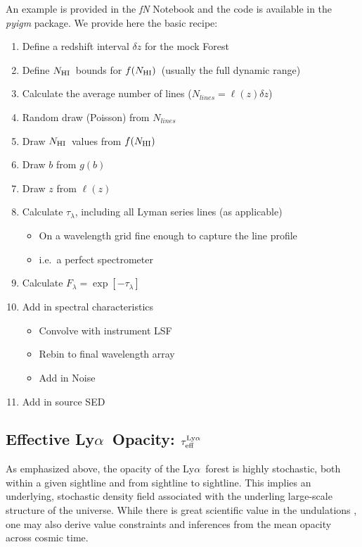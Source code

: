 \documentclass[graybox]{svmult}
\def\lya{Ly$\alpha$}
\newcommand{\mnhi}{N_{\rm HI}}
\newcommand{\nhi}{$\mnhi$}
\def\mfnhi{f(\mnhi)}
\def\fnhi{$\mfnhi$}
\begin{document}
An example is provided in the {\it fN} Notebook and the
code is available in the {\it pyigm} package.  We provide
here the basic recipe:

\begin{enumerate}
		\item Define a redshift interval $\delta z$ for the mock Forest
		\item Define \nhi\ bounds for \fnhi\ (usually the full dynamic range)
		\item Calculate the average number of lines 
		($N_{lines} = \ell(z) \delta z$)
		\item Random draw (Poisson) from $N_{lines}$
		\item Draw \nhi\ values from \fnhi
		\item Draw $b$ from $g(b)$
		\item Draw $z$ from $\ell(z)$
		\item Calculate $\tau_\lambda$, including all 
		Lyman series lines (as applicable)
			\begin{itemize}
			\item On a wavelength grid fine enough to 
			capture the line profile
			\item i.e.\ a perfect spectrometer
			\end{itemize}
		\item Calculate $F_\lambda = \exp[-\tau_\lambda]$
		\item Add in spectral characteristics
			\begin{itemize}
			\item Convolve with instrument LSF
			\item Rebin to final wavelength array
			\item Add in Noise
			\end{itemize}
		\item Add in source SED
\end{enumerate}

\subsection{Effective \lya\ Opacity: $\tau_{\rm eff}^{\rm Ly\alpha}$}
\label{sec:teff_lya}
As emphasized above, the opacity of the \lya\ forest
is highly stochastic, both within a given sightline and
from sightline to sightline.
This implies an underlying, stochastic density field
associated with the underling large-scale structure of the
universe.  While there is great scientific value in the
undulations \cite[e.g.]{lee1X,natalie}, one may also derive
value constraints and inferences from the mean opacity across
cosmic time.  
\end{document}
